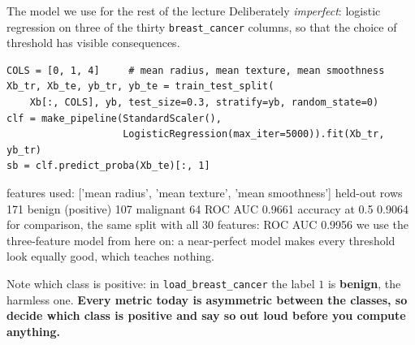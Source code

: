 \documentclass[aspectratio=169]{beamer}
\begin{document}
\begin{frame}[fragile,shrink=6]{The model we use for the rest of the lecture}
Deliberately \emph{imperfect}: logistic regression on three of the thirty
\texttt{breast\_cancer} columns, so that the choice of threshold has visible
consequences.
\begin{lstlisting}
COLS = [0, 1, 4]     # mean radius, mean texture, mean smoothness
Xb_tr, Xb_te, yb_tr, yb_te = train_test_split(
    Xb[:, COLS], yb, test_size=0.3, stratify=yb, random_state=0)
clf = make_pipeline(StandardScaler(),
                    LogisticRegression(max_iter=5000)).fit(Xb_tr, yb_tr)
sb = clf.predict_proba(Xb_te)[:, 1]
\end{lstlisting}
\begin{outblk}
features used: ['mean radius', 'mean texture', 'mean smoothness']
held-out rows 171   benign (positive) 107   malignant 64
ROC AUC 0.9661   accuracy at 0.5 0.9064
for comparison, the same split with all 30 features: ROC AUC 0.9956
we use the three-feature model from here on: a near-perfect model
makes every threshold look equally good, which teaches nothing.
\end{outblk}
\begin{center}\small
  Note which class is positive: in \texttt{load\_breast\_cancer} the label $1$
  is \textbf{benign}, the harmless one. \textbf{Every metric today is
  asymmetric between the classes, so decide which class is positive and say
  so out loud before you compute anything.}
\end{center}
\end{frame}
\end{document}
